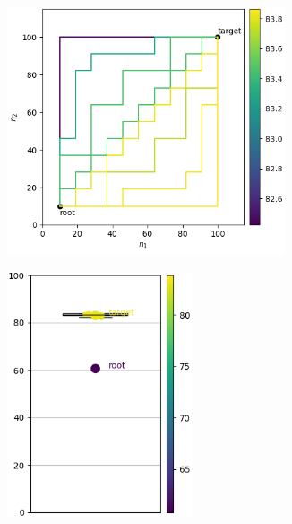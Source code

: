 \documentclass{article}
\begin{document}
\begin{figure}[htbp]
    \centering
    \begin{subfigure}[b]{0.29\textwidth}
        \centering
        \includegraphics[width=0.9\textwidth]{imgs/pathes_FMNIST_gradmax_2024_05_02_15_23_40.png}
    \end{subfigure}
    \begin{subfigure}[b]{0.29\textwidth}
        \centering
        \includegraphics[width=0.6\textwidth]{imgs/box_plot_FMNIST_gradmax_2024_05_02_15_23_40.png}
    \end{subfigure}
    

\end{figure}
\end{document}
